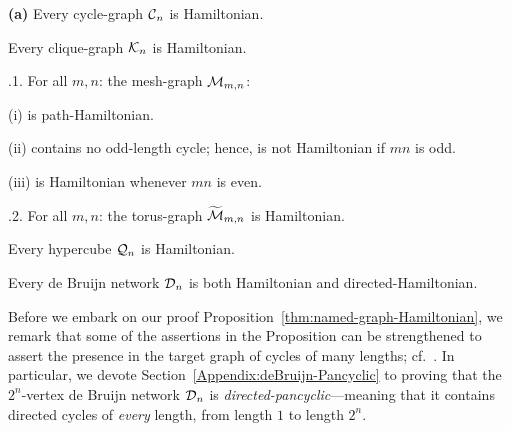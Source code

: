 \begin{prop}
\label{thm:named-graph-Hamiltonian}
\label{thm:deBruijn-Hamiltonian}
{\bf (a)}
Every cycle-graph $\mbox{$\cal C$}_n$ is Hamiltonian.

\smallskip

Every clique-graph $\mbox{$\cal K$}_n$ is Hamiltonian.

\smallskip

.1.
For all $m,n$: the mesh-graph $\mbox{$\cal M$}_{m,n}$:

(i)  is path-Hamiltonian.

(ii) contains no odd-length cycle; hence, is not Hamiltonian if $mn$ is odd.

(iii) is Hamiltonian whenever $mn$ is even.

\smallskip

.2.
For all $m,n$: the torus-graph $\widetilde{\mbox{$\cal M$}}_{m,n}$ is Hamiltonian.

\smallskip

Every hypercube $\mbox{$\cal Q$}_n$  is Hamiltonian.

\smallskip

Every de Bruijn network $\mbox{$\cal D$}_n$ is both Hamiltonian and directed-Hamiltonian.
\end{prop}
 
  

Before we embark on our proof Proposition~\ref{thm:named-graph-Hamiltonian}, we remark that some of the assertions in the Proposition can be strengthened to assert the presence in the target graph of cycles of many lengths; cf.~\cite{Rosenberg91}.  In particular, we devote Section~\ref{Appendix:deBruijn-Pancyclic} to proving that the $2^n$-vertex de Bruijn network $\mbox{$\cal D$}_n$ is {\it directed-pancyclic}---meaning that it contains directed cycles of {\em every} length, from length $1$ to length $2^n$.

